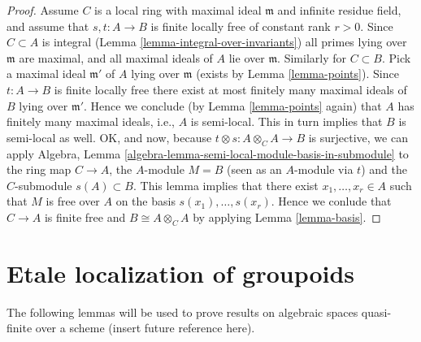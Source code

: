 \begin{proof}
\medskip\noindent
Assume $C$ is a local ring with maximal ideal $\mathfrak m$ and
infinite residue field, and assume that $s, t : A \to B$ is
finite locally free of constant rank $r > 0$.
Since $C \subset A$ is integral (Lemma \ref{lemma-integral-over-invariants})
all primes lying over $\mathfrak m$ are maximal, and all maximal
ideals of $A$ lie over $\mathfrak m$. Similarly for $C \subset B$.
Pick a maximal ideal $\mathfrak m'$
of $A$ lying over $\mathfrak m$ (exists by Lemma \ref{lemma-points}). 
Since $t : A \to B$ is finite locally free there exist at most finitely
many maximal ideals of $B$ lying over $\mathfrak m'$. Hence we conclude
(by Lemma \ref{lemma-points} again)
that $A$ has finitely many maximal ideals, i.e.,
$A$ is semi-local. This in turn implies that $B$ is semi-local as
well. OK, and now, because $t \otimes s : A \otimes_C A \to B$ is surjective,
we can apply
Algebra, Lemma \ref{algebra-lemma-semi-local-module-basis-in-submodule}
to the ring map $C \to A$, the $A$-module $M = B$ (seen as an $A$-module
via $t$) and the $C$-submodule $s(A) \subset B$. This lemma implies that there
exist $x_1, \ldots, x_r \in A$ such that $M$ is free over $A$
on the basis $s(x_1), \ldots, s(x_r)$. Hence we conlude that $C \to A$
is finite free and $B \cong A \otimes_C A$ by applying
Lemma \ref{lemma-basis}.
\end{proof}






\section{Etale localization of groupoids}
\label{section-etale-localize}

\noindent
The following lemmas will be used to prove results on algebraic spaces
quasi-finite over a scheme (insert future reference here).

